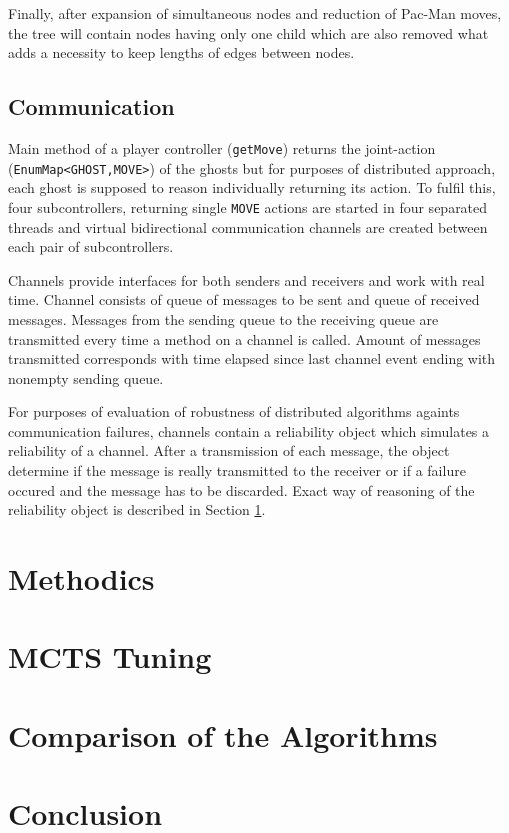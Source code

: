 Finally, after expansion of simultaneous nodes and reduction of Pac-Man moves, the tree
will contain nodes having only one child which are also removed what adds a necessity to keep
lengths of edges between nodes.


\subsection{Communication}

Main method of a player controller (\texttt{getMove}) returns the joint-action
(\texttt{EnumMap<GHOST,MOVE>}) of the ghosts
but for purposes of distributed approach, each ghost is supposed to reason individually 
returning its action. To fulfil this, four subcontrollers, returning single \texttt{MOVE}
actions are started in four separated threads and virtual bidirectional communication 
channels are created between each pair of subcontrollers.

Channels provide interfaces for both senders and receivers and work with real time. Channel
consists of queue of messages to be sent and queue of received messages. Messages from the
sending queue to the receiving queue are transmitted every time a method on a channel is
called. Amount of messages transmitted corresponds with time elapsed since last channel event
ending with nonempty sending queue.

For purposes of evaluation of robustness of distributed algorithms againts communication
failures, channels contain a reliability object which simulates a reliability of a channel.
After a transmission of each message, the object determine if the message is really transmitted
to the receiver or if a failure occured and the message has to be discarded. Exact way of
reasoning of the reliability object is described in Section \ref{sec_methodics}.


\section{Methodics}
\label{sec_methodics}

\section{MCTS Tuning}

\section{Comparison of the Algorithms}

\section{Conclusion}
